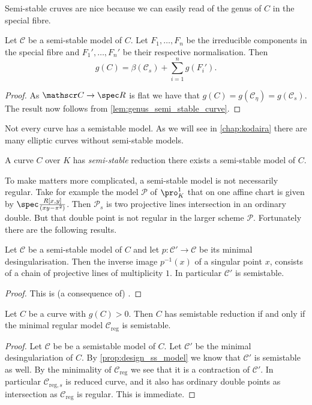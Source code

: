 Semi-stable cruves are nice because we can easily read of the genus of $C$ in the special fibre. 
\begin{lemma}\label{lem:genus_semi_stable_model}
	Let $\mathscr C$ be a semi-stable model of  $C$. 
	Let $F_1, \ldots, F_n$ be the irreducible components in the special fibre and  $F_1', \ldots, F_n'$ be their respective normalisation. 
	Then \[
		g(C) = \beta(\mathscr C_s) + \sum_{i = 1}^{n} g(F_i')
	.\] 
\end{lemma}
\begin{proof}
	As $\mathscr C \to \spec R$ is flat we have that $g(C) = g(\mathscr C_\eta) = g(\mathscr C_s)$. 
	The result now follows from \cref{lem:genus_semi_stable_curve}. 
\end{proof}

Not every curve has a semistable model.
As we will see in \cref{chap:kodaira} there are many elliptic curves without semi-stable models. 
\begin{definition}
	A curve $C$ over $K$ has \emph{semi-stable} reduction there exists a semi-stable model of $C$. 
\end{definition}
To make matters more complicated, a semi-stable model is not necessarily regular. 
Take for example the model $\mathscr P$ of $\pro^{1}_K$ that on one affine chart is given by $\spec \frac{R[x, y]}{(xy  - \pi^{2})}$. 
Then $\mathscr P_s$ is two projective lines intersection in an ordinary double.
But that double point is not regular in the larger scheme $\mathscr P$. 
Fortunately there are the following results. 
\begin{proposition}\label{prop:design_ss_model}
	Let $\mathscr C$ be a semi-stable model of $C$ and let $p:\mathscr C' \to \mathscr C$
	be its minimal desingularisation. 
	Then the inverse image $p^{-1}(x)$ of a singular point $x$, consists of a chain of projective lines of multiplicity $1$. 
	In particular $\mathscr C'$ is semistable. 
\end{proposition}
\begin{proof}
	This is (a consequence of) \cite[cor.\ 10.3.25]{liuAlgebraicGeometryArithmetic2002}.
\end{proof}
\begin{corollary}
	Let $C$ be a curve with  $g(C) > 0$.
	Then $C$ has semistable reduction if and only if the minimal regular model  $\mathscr C_\text{reg} $ is semistable. 
\end{corollary}
\begin{proof}
	\ltr Let $\mathscr C$ be be a semistable model of $C$. 
	Let $\mathscr C'$ be the minimal desingulariation of $C$. 
	By \cref{prop:design_ss_model} we know that  $\mathscr C'$ is semistable as well. 
	By the minimality of $\mathscr C_\text{reg} $ we see that it is a contraction of $\mathscr C'$. 
	In particular $\mathscr C_{\text{reg}, s}$ is reduced curve, and it also has ordinary double points as intersection as $\mathscr C_\text{reg} $ is regular.
	\rtl This is immediate. 
\end{proof}

